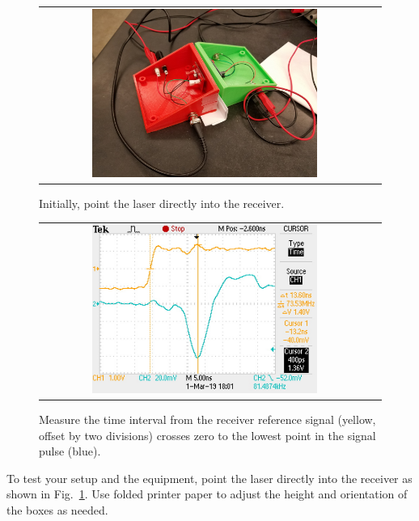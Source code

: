 \begin{figure}[htbp]
\begin{center}
\begin{tabular}{cc}
\includegraphics[width=0.7\textwidth]{figs/labs/c_air/tzero.jpg}
\end{tabular}
\end{center}
\caption{\label{fig:ctzero} Initially, point the laser directly into the receiver.}
\end{figure}

\begin{figure}[htbp]
\begin{center}
\begin{tabular}{cc}
\includegraphics[width=0.7\textwidth]{figs/labs/c_air/time_peak.jpg}
\end{tabular}
\end{center}
\caption{\label{fig:ctime} Measure the time interval from the receiver reference signal (yellow, offset by two divisions) crosses zero to the lowest point in the signal pulse (blue).}
\end{figure}

To test your setup and the equipment, point the laser directly into
the receiver as shown in Fig.~\ref{fig:ctzero}.  Use folded printer
paper to adjust the height and orientation of the boxes as needed.  

